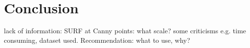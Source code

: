 \documentclass{SMBV12}
\begin{document}
\cite{nakagomimulti}

\section{Conclusion}

lack of information: SURF at Canny points: what scale?
some criticisms e.g. time consuming, dataset used. Recommendation: what to use, why?

%
\def\refname{Literature}





\end{document}
